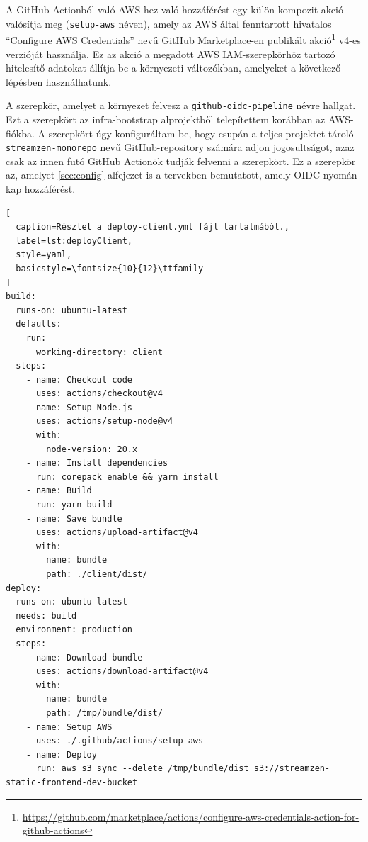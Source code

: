A GitHub Actionból való AWS-hez való hozzáférést egy külön kompozit akció valósítja meg (\verb|setup-aws| néven), amely az AWS által fenntartott hivatalos ``Configure AWS Credentials'' nevű GitHub Marketplace-en publikált akció\footnote{\url{https://github.com/marketplace/actions/configure-aws-credentials-action-for-github-actions}} v4-es verzióját használja. Ez az akció a megadott AWS IAM-szerepkörhöz tartozó hitelesítő adatokat állítja be a környezeti változókban, amelyeket a következő lépésben használhatunk.

A szerepkör, amelyet a környezet felvesz a \verb|github-oidc-pipeline| névre hallgat. Ezt a szerepkört az infra-bootstrap alprojektből telepítettem korábban az AWS-fiókba. A szerepkört úgy konfiguráltam be, hogy csupán a teljes projektet tároló \verb|streamzen-monorepo| nevű GitHub-repository számára adjon jogosultságot, azaz csak az innen futó GitHub Actionök tudják felvenni a szerepkört. Ez a szerepkör az, amelyet \ref{sec:config} alfejezet is a tervekben bemutatott, amely OIDC nyomán kap hozzáférést.

\begin{minipage}{0.92\textwidth}
  \begin{lstlisting}[
  caption=Részlet a deploy-client.yml fájl tartalmából.,
  label=lst:deployClient,
  style=yaml,
  basicstyle=\fontsize{10}{12}\ttfamily
]
build:
  runs-on: ubuntu-latest
  defaults:
    run:
      working-directory: client
  steps:
    - name: Checkout code
      uses: actions/checkout@v4
    - name: Setup Node.js
      uses: actions/setup-node@v4
      with:
        node-version: 20.x
    - name: Install dependencies
      run: corepack enable && yarn install
    - name: Build
      run: yarn build
    - name: Save bundle
      uses: actions/upload-artifact@v4
      with:
        name: bundle
        path: ./client/dist/
deploy:
  runs-on: ubuntu-latest
  needs: build
  environment: production
  steps:
    - name: Download bundle
      uses: actions/download-artifact@v4
      with:
        name: bundle
        path: /tmp/bundle/dist/
    - name: Setup AWS
      uses: ./.github/actions/setup-aws
    - name: Deploy
      run: aws s3 sync --delete /tmp/bundle/dist s3://streamzen-static-frontend-dev-bucket
\end{lstlisting}
\end{minipage}
